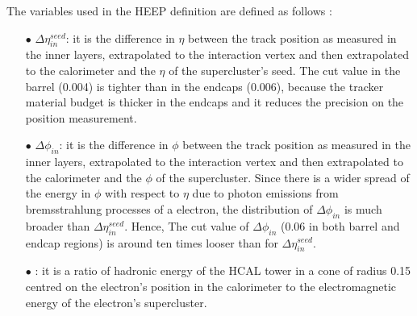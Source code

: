 The variables used in the HEEP definition are defined as follows \cite{HEEP_twiki}:
\begin{itemize}
\item[$\bullet$] \textbf{$\Delta\eta_{in}^{seed}$}:
 it is the difference in $\eta$ between the track position as measured in the inner layers, extrapolated to the interaction vertex and then extrapolated to the calorimeter and the $\eta$ of the supercluster's seed. The cut value in the barrel (0.004) is tighter than in the endcaps (0.006), because the tracker material budget is thicker in the endcaps and it reduces the precision on the position measurement.
\item[$\bullet$] \textbf{$\Delta\phi_{in}$}: it is the difference in $\phi$ between the track position as measured in the inner layers, extrapolated to the interaction vertex and then extrapolated to the calorimeter and the $\phi$ of the supercluster. Since there is a wider spread of the energy in $\phi$ with respect to $\eta$ due to photon emissions from bremsstrahlung processes of a electron, the distribution of $\Delta\phi_{in}$ is much broader than $\Delta\eta_{in}^{seed}$. Hence, The cut value of $\Delta\phi_{in}$ (0.06 in both barrel and endcap regions) is around ten times looser than for $\Delta\eta_{in}^{seed}$.

\item[$\bullet$] \textbf{\hoe}: it is a ratio of hadronic energy of the HCAL tower in a cone of radius 0.15 centred on the electron's position in the calorimeter to the electromagnetic energy of the electron's supercluster.


\end{itemize}
